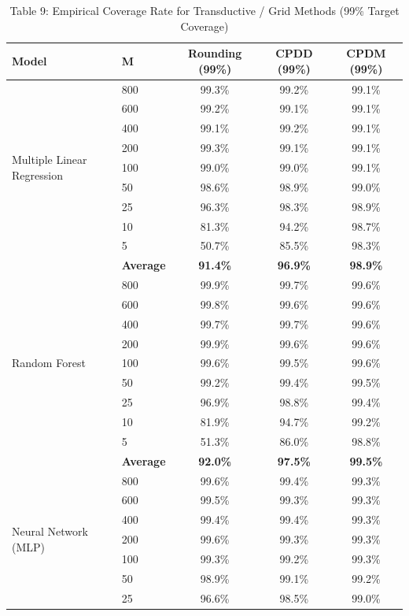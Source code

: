 \documentclass[11pt,a4paper]{article}
\begin{document}
\begin{table}[H]
\centering
\caption{Table 9: Empirical Coverage Rate for Transductive / Grid Methods (99\% Target Coverage)}
\label{tab:team_tab9}
\scriptsize
\begin{tabular}{llccc}
\toprule
Model & M & Rounding (99\%) & CPDD (99\%) & CPDM (99\%) \\
\midrule
\multirow{9}{*}{Multiple Linear Regression}
 & 800 & 99.3\% & 99.2\% & 99.1\% \\
 & 600 & 99.2\% & 99.1\% & 99.1\% \\
 & 400 & 99.1\% & 99.2\% & 99.1\% \\
 & 200 & 99.3\% & 99.1\% & 99.1\% \\
 & 100 & 99.0\% & 99.0\% & 99.1\% \\
 & 50  & 98.6\% & 98.9\% & 99.0\% \\
 & 25  & 96.3\% & 98.3\% & 98.9\% \\
 & 10  & 81.3\% & 94.2\% & 98.7\% \\
 & 5   & 50.7\% & 85.5\% & 98.3\% \\
 & \textbf{Average} & \textbf{91.4\%} & \textbf{96.9\%} & \textbf{98.9\%} \\
\midrule
\multirow{9}{*}{Random Forest}
 & 800 & 99.9\% & 99.7\% & 99.6\% \\
 & 600 & 99.8\% & 99.6\% & 99.6\% \\
 & 400 & 99.7\% & 99.7\% & 99.6\% \\
 & 200 & 99.9\% & 99.6\% & 99.6\% \\
 & 100 & 99.6\% & 99.5\% & 99.6\% \\
 & 50  & 99.2\% & 99.4\% & 99.5\% \\
 & 25  & 96.9\% & 98.8\% & 99.4\% \\
 & 10  & 81.9\% & 94.7\% & 99.2\% \\
 & 5   & 51.3\% & 86.0\% & 98.8\% \\
 & \textbf{Average} & \textbf{92.0\%} & \textbf{97.5\%} & \textbf{99.5\%} \\
\midrule
\multirow{9}{*}{Neural Network (MLP)}
 & 800 & 99.6\% & 99.4\% & 99.3\% \\
 & 600 & 99.5\% & 99.3\% & 99.3\% \\
 & 400 & 99.4\% & 99.4\% & 99.3\% \\
 & 200 & 99.6\% & 99.3\% & 99.3\% \\
 & 100 & 99.3\% & 99.2\% & 99.3\% \\
 & 50  & 98.9\% & 99.1\% & 99.2\% \\
 & 25  & 96.6\% & 98.5\% & 99.0\% \\

\end{tabular}
\end{table}
\end{document}
